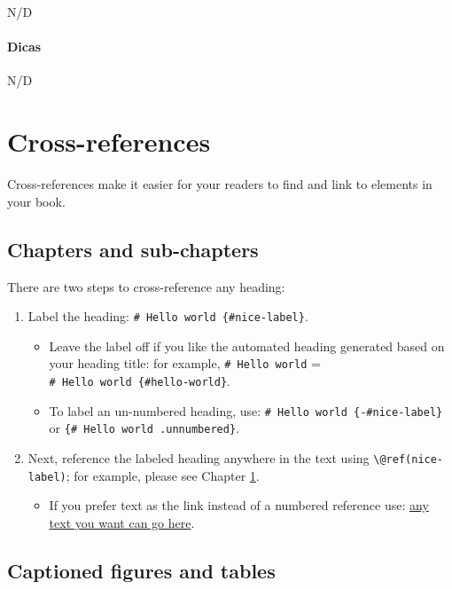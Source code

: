 \documentclass[
]{book}
\providecommand{\tightlist}{%
  \setlength{\itemsep}{0pt}\setlength{\parskip}{0pt}}
\theoremstyle{definition}
\theoremstyle{definition}
\theoremstyle{definition}
\theoremstyle{definition}
\theoremstyle{remark}
\begin{document}
N/D

\hypertarget{dicas}{%
\subsubsection{Dicas}\label{dicas}}

N/D

\hypertarget{cross}{%
\chapter{Cross-references}\label{cross}}

Cross-references make it easier for your readers to find and link to elements in your book.

\hypertarget{chapters-and-sub-chapters}{%
\section{Chapters and sub-chapters}\label{chapters-and-sub-chapters}}

There are two steps to cross-reference any heading:

\begin{enumerate}
\def\labelenumi{\arabic{enumi}.}
\tightlist
\item
  Label the heading: \texttt{\#\ Hello\ world\ \{\#nice-label\}}.

  \begin{itemize}
  \tightlist
  \item
    Leave the label off if you like the automated heading generated based on your heading title: for example, \texttt{\#\ Hello\ world} = \texttt{\#\ Hello\ world\ \{\#hello-world\}}.
  \item
    To label an un-numbered heading, use: \texttt{\#\ Hello\ world\ \{-\#nice-label\}} or \texttt{\{\#\ Hello\ world\ .unnumbered\}}.
  \end{itemize}
\item
  Next, reference the labeled heading anywhere in the text using \texttt{\textbackslash{}@ref(nice-label)}; for example, please see Chapter \ref{cross}.

  \begin{itemize}
  \tightlist
  \item
    If you prefer text as the link instead of a numbered reference use: \protect\hyperlink{cross}{any text you want can go here}.
  \end{itemize}
\end{enumerate}

\hypertarget{captioned-figures-and-tables}{%
\section{Captioned figures and tables}\label{captioned-figures-and-tables}}
\end{document}
